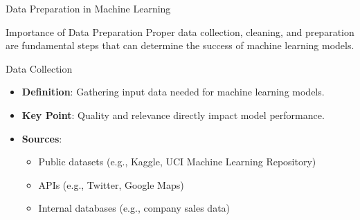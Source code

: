 \documentclass[aspectratio=169]{beamer}
\begin{document}
\begin{frame}[fragile]{Data Preparation in Machine Learning}
    \begin{block}{Importance of Data Preparation}
        Proper data collection, cleaning, and preparation are fundamental steps that can determine the success of machine learning models.
    \end{block}
\end{frame}

\begin{frame}[fragile]{Data Collection}
    \begin{itemize}
        \item \textbf{Definition}: Gathering input data needed for machine learning models.
        \item \textbf{Key Point}: Quality and relevance directly impact model performance.
        \item \textbf{Sources}:
            \begin{itemize}
                \item Public datasets (e.g., Kaggle, UCI Machine Learning Repository)
                \item APIs (e.g., Twitter, Google Maps)
                \item Internal databases (e.g., company sales data)
            \end{itemize}
    \end{itemize}
\end{frame}
\end{document}
